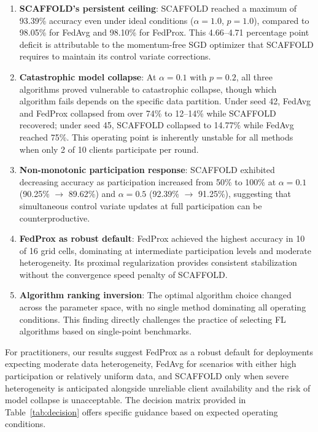 \documentclass[conference]{IEEEtran}
\begin{document}
\begin{enumerate}
    \item \textbf{SCAFFOLD's persistent ceiling}: SCAFFOLD reached a maximum of 93.39\% accuracy even under ideal conditions ($\alpha = 1.0$, $p = 1.0$), compared to 98.05\% for FedAvg and 98.10\% for FedProx. This 4.66--4.71 percentage point deficit is attributable to the momentum-free SGD optimizer that SCAFFOLD requires to maintain its control variate corrections.

    \item \textbf{Catastrophic model collapse}: At $\alpha = 0.1$ with $p = 0.2$, all three algorithms proved vulnerable to catastrophic collapse, though which algorithm fails depends on the specific data partition. Under seed 42, FedAvg and FedProx collapsed from over 74\% to 12--14\% while SCAFFOLD recovered; under seed 45, SCAFFOLD collapsed to 14.77\% while FedAvg reached 75\%. This operating point is inherently unstable for all methods when only 2 of 10 clients participate per round.

    \item \textbf{Non-monotonic participation response}: SCAFFOLD exhibited decreasing accuracy as participation increased from 50\% to 100\% at $\alpha = 0.1$ (90.25\% $\to$ 89.62\%) and $\alpha = 0.5$ (92.39\% $\to$ 91.25\%), suggesting that simultaneous control variate updates at full participation can be counterproductive.

    \item \textbf{FedProx as robust default}: FedProx achieved the highest accuracy in 10 of 16 grid cells, dominating at intermediate participation levels and moderate heterogeneity. Its proximal regularization provides consistent stabilization without the convergence speed penalty of SCAFFOLD.

    \item \textbf{Algorithm ranking inversion}: The optimal algorithm choice changed across the parameter space, with no single method dominating all operating conditions. This finding directly challenges the practice of selecting FL algorithms based on single-point benchmarks.
\end{enumerate}

For practitioners, our results suggest FedProx as a robust default for deployments expecting moderate data heterogeneity, FedAvg for scenarios with either high participation or relatively uniform data, and SCAFFOLD only when severe heterogeneity is anticipated alongside unreliable client availability and the risk of model collapse is unacceptable. The decision matrix provided in Table~\ref{tab:decision} offers specific guidance based on expected operating conditions.
\end{document}

